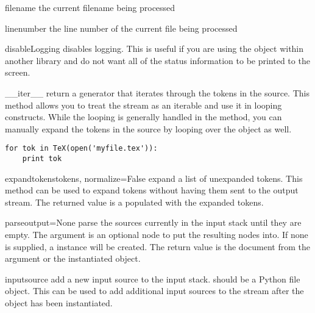 \documentclass{manual}
\begin{document}
\begin{memberdesc}[TeX]{filename}
the current filename being processed
\end{memberdesc}

\begin{memberdesc}[TeX]{linenumber}
the line number of the current file being processed 
\end{memberdesc}

\begin{methoddesc}[TeX]{disableLogging}{}
disables logging.  This is useful if you are using the  object
within another library and do not want all of the status information to 
be printed to the screen.
\end{methoddesc}

\begin{methoddesc}[TeX]{\_\_iter\_\_}{}
return a generator that iterates through the tokens in the source.  
This method allows you to treat the  stream as an iterable
and use it in looping constructs.  While the looping is generally
handled in the  method, you can manually expand the
tokens in the source by looping over the  object as well.
\begin{verbatim}
for tok in TeX(open('myfile.tex')):
    print tok
\end{verbatim}
\end{methoddesc}

\begin{methoddesc}[TeX]{expandtokens}{tokens, normalize=False}
expand a list of unexpanded tokens.  This method can be used to expand
tokens without having them sent to the output stream.  The returned value
is a  populated with the expanded tokens.
\end{methoddesc}

\begin{methoddesc}[TeX]{parse}{output=None}
parse the sources currently in the input stack until they are empty.
The  argument is an optional  node to put
the resulting nodes into.  If none is supplied, a 
instance will be created.  The return value is the document from the
 argument or the instantiated  object.
\end{methoddesc}

\begin{methoddesc}[TeX]{input}{source}
add a new input source to the input stack.   should be
a Python file object.  This can be used to add additional input sources
to the stream after the  object has been instantiated.
\end{methoddesc}
\end{document}
